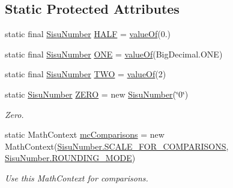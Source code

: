 \subsection*{Static Protected Attributes}
\begin{DoxyCompactItemize}
\item 
static final \hyperlink{classcom_1_1aarrelaakso_1_1drawl_1_1_sisu_number}{Sisu\+Number} \hyperlink{classcom_1_1aarrelaakso_1_1drawl_1_1_sisu_number_afae3e6d652b8c125dccab3e110d038b0}{H\+A\+LF} = \hyperlink{classcom_1_1aarrelaakso_1_1drawl_1_1_sisu_number_abf3f63611bbeb0505b3d6217ba140f9b}{value\+Of}(0.)
\item 
static final \hyperlink{classcom_1_1aarrelaakso_1_1drawl_1_1_sisu_number}{Sisu\+Number} \hyperlink{classcom_1_1aarrelaakso_1_1drawl_1_1_sisu_number_ad74e537df980406b3282861605df259c}{O\+NE} = \hyperlink{classcom_1_1aarrelaakso_1_1drawl_1_1_sisu_number_abf3f63611bbeb0505b3d6217ba140f9b}{value\+Of}(Big\+Decimal.\+O\+NE)
\item 
static final \hyperlink{classcom_1_1aarrelaakso_1_1drawl_1_1_sisu_number}{Sisu\+Number} \hyperlink{classcom_1_1aarrelaakso_1_1drawl_1_1_sisu_number_a699eb6b7e4648b4a8d888890b32e26f9}{T\+WO} = \hyperlink{classcom_1_1aarrelaakso_1_1drawl_1_1_sisu_number_abf3f63611bbeb0505b3d6217ba140f9b}{value\+Of}(2)
\item 
static \hyperlink{classcom_1_1aarrelaakso_1_1drawl_1_1_sisu_number}{Sisu\+Number} \hyperlink{classcom_1_1aarrelaakso_1_1drawl_1_1_sisu_number_ae9e547c1510ee19d5cc6401c828f1003}{Z\+E\+RO} = new \hyperlink{classcom_1_1aarrelaakso_1_1drawl_1_1_sisu_number}{Sisu\+Number}(\char`\"{}0\char`\"{})
\begin{DoxyCompactList}\small\item\em Zero. \end{DoxyCompactList}\item 
static Math\+Context \hyperlink{classcom_1_1aarrelaakso_1_1drawl_1_1_sisu_number_a09a6e4440f1be870727ad0bc028fc237}{mc\+Comparisons} = new Math\+Context(\hyperlink{classcom_1_1aarrelaakso_1_1drawl_1_1_sisu_number_a4630f8f5414673cb5021dc7d194dc257}{Sisu\+Number.\+S\+C\+A\+L\+E\+\_\+\+F\+O\+R\+\_\+\+C\+O\+M\+P\+A\+R\+I\+S\+O\+NS}, \hyperlink{classcom_1_1aarrelaakso_1_1drawl_1_1_sisu_number_a98077c422e928740febf571e3f2ec6b5}{Sisu\+Number.\+R\+O\+U\+N\+D\+I\+N\+G\+\_\+\+M\+O\+DE})
\begin{DoxyCompactList}\small\item\em Use this Math\+Context for comparisons. \end{DoxyCompactList}\item 

\end{DoxyCompactItemize}
